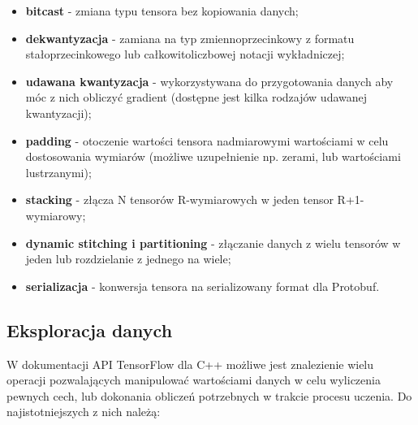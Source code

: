 \begin{itemize}
	\item \textbf{bitcast} - zmiana typu tensora bez kopiowania danych;
	\item \textbf{dekwantyzacja} - zamiana na typ zmiennoprzecinkowy z formatu stałoprzecinkowego lub całkowitoliczbowej notacji wykładniczej;
	\item \textbf{udawana kwantyzacja} - wykorzystywana do przygotowania danych aby móc z nich obliczyć gradient (dostępne jest kilka rodzajów udawanej kwantyzacji);
	\item \textbf{padding} - otoczenie wartości tensora nadmiarowymi wartościami w celu dostosowania wymiarów (możliwe uzupełnienie np. zerami, lub wartościami lustrzanymi);
	\item \textbf{stacking} - złącza N tensorów R-wymiarowych w jeden tensor R+1-wymiarowy;
	\item \textbf{dynamic stitching i partitioning} - złączanie danych z wielu tensorów w jeden lub rozdzielanie z jednego na wiele;
	\item \textbf{serializacja} - konwersja tensora na serializowany format dla Protobuf.
\end{itemize}

\subsection{Eksploracja danych}

W dokumentacji API TensorFlow dla C++ możliwe jest znalezienie wielu operacji pozwalających manipulować wartościami danych w celu wyliczenia pewnych cech, lub dokonania obliczeń potrzebnych w trakcie procesu uczenia\cite{tfcpp}. Do najistotniejszych z nich należą:

